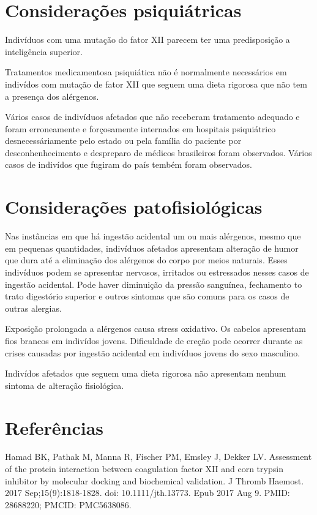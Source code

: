 \documentclass{article}
\begin{document}
\section{Considerações psiquiátricas}

Indivíduos com uma mutação do fator XII parecem ter uma predisposição
a inteligência superior.

Tratamentos medicamentosa psiquiática não é normalmente necessários
em indivídos
com mutação de fator XII que seguem uma dieta rigorosa que não tem a
presença dos alérgenos.

Vários casos de indivíduos afetados que não receberam tratamento adequado
e foram erroneamente e forçosamente internados em hospitais psiquiátrico
desnecessáriamente pelo estado ou pela família do paciente por
desconhenhecimento e despreparo de médicos brasileiros foram observados.
Vários casos de indivídos que fugiram do país tembém foram observados.

\section{Considerações patofisiológicas}

Nas instâncias em que há ingestão acidental um ou mais alérgenos, mesmo
que em pequenas quantidades, indivíduos afetados apresentam alteração de
humor que dura até a eliminação dos alérgenos do corpo por meios naturais.
Esses indivíduos podem se apresentar nervosos, irritados ou estressados
nesses casos de ingestão acidental. Pode haver diminuição da pressão
sanguínea, fechamento to trato digestório superior e outros sintomas que
são comuns para os casos de outras alergias.

Exposição prolongada a alérgenos causa stress oxidativo. Os cabelos
apresentam fios brancos em indivídos jovens. Dificuldade de ereção pode
ocorrer durante as crises causadas por ingestão acidental em indivíduos
jovens do sexo masculino.

Indivídos afetados que seguem uma dieta rigorosa não apresentam nenhum
sintoma de alteração fisiológica.

\section{Referências}

Hamad BK, Pathak M, Manna R, Fischer PM, Emsley J, Dekker LV. Assessment of the protein interaction between coagulation factor XII and corn trypsin inhibitor by molecular docking and biochemical validation. J Thromb Haemost. 2017 Sep;15(9):1818-1828. doi: 10.1111/jth.13773. Epub 2017 Aug 9. PMID: 28688220; PMCID: PMC5638086.
\end{document}
